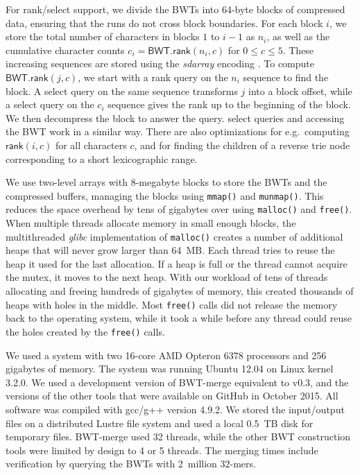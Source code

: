 \documentclass[smallabstract,smallcaptions]{dccpaper}
\newcommand{\BWT}{\textsf{BWT}}
\newcommand{\mBWT}{\ensuremath{\mathsf{BWT}}}
\newcommand{\rank}{\textsf{rank}}
\newcommand{\select}{\textsf{select}}
\newcommand{\mrank}{\ensuremath{\mathsf{rank}}}
\newcommand{\BWTmerge}{\textsf{BWT\nobreakdash-merge}}
\begin{document}
For \rank/\select{} support, we divide the \BWT{}s into 64\nobreakdash-byte blocks of compressed data, ensuring that the runs do not cross block boundaries. For each block $i$, we store the total number of characters in blocks $1$ to $i-1$ as $n_{i}$, as well as the cumulative character counts $c_{i} = \mBWT.\mrank(n_{i},c)$ for $0 \le c \le 5$. These increasing sequences are stored using the \emph{sdarray} encoding \cite{Okanohara2007}. To compute $\mBWT.\mrank(j,c)$, we start with a \rank{} query on the $n_{i}$ sequence to find the block. A \select{} query on the same sequence transforms $j$ into a block offset, while a \select{} query on the $c_{i}$ sequence gives the rank up to the beginning of the block. We then decompress the block to answer the query. \select{} queries and accessing the \BWT{} work in a similar way. There are also optimizations for e.g.~computing $\mrank(i,c)$ for all characters $c$, and for finding the children of a reverse trie node corresponding to a short lexicographic range.

We use two-level arrays with 8\nobreakdash-megabyte blocks to store the \BWT{}s and the compressed buffers, managing the blocks using \texttt{mmap()} and \texttt{munmap()}. This reduces the space overhead by tens of gigabytes over using \texttt{malloc()} and \texttt{free()}.
When multiple threads allocate memory in small enough blocks, the multithreaded \emph{glibc} implementation of \texttt{malloc()} creates a number of additional heaps that will never grow larger than 64~MB. Each thread tries to reuse the heap it used for the last allocation. If a heap is full or the thread cannot acquire the mutex, it moves to the next heap. With our workload of tens of threads allocating and freeing hundreds of gigabytes of memory, this created thousands of heaps with holes in the middle. Most \texttt{free()} calls did not release the memory back to the operating system, while it took a while before any thread could reuse the holes created by the \texttt{free()} calls.



We used a system with two 16\nobreakdash-core AMD Opteron 6378 processors and 256 gigabytes of memory. The system was running Ubuntu 12.04 on Linux kernel 3.2.0. We used a development version of \BWTmerge{}  equivalent to v0.3, and the versions of the other tools that were available on GitHub in October 2015. All software was compiled with gcc/g++ version 4.9.2. We stored the input/output files on a distributed Lustre file system and used a local 0.5~TB disk for temporary files. \BWTmerge{} used 32 threads, while the other \BWT{} construction tools were limited by design to 4 or 5 threads.
The merging times include verification by querying the \BWT{}s with 2~million $32$\nobreakdash-mers.
\end{document}
